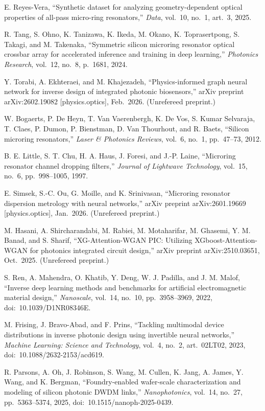 \documentclass[11pt]{article}
\begin{document}
\begin{enumerate}[label={[\arabic*]},leftmargin=2.2em,itemsep=3pt]
E. Reyes-Vera, ``Synthetic dataset for analyzing geometry-dependent optical
properties of all-pass micro-ring resonators,'' \emph{Data}, vol.~10, no.~1,
art.~3, 2025.
\item R. Tang, S. Ohno, K. Tanizawa, K. Ikeda, M. Okano, K. Toprasertpong,
S. Takagi, and M. Takenaka, ``Symmetric silicon microring resonator optical
crossbar array for accelerated inference and training in deep learning,''
\emph{Photonics Research}, vol.~12, no.~8, p.~1681, 2024.
\item Y. Torabi, A. Ekhteraei, and M. Khajezadeh, ``Physics-informed graph
neural network for inverse design of integrated photonic biosensors,'' arXiv
preprint arXiv:2602.19082 [physics.optics], Feb.\ 2026. (Unrefereed preprint.)
\item W. Bogaerts, P. De Heyn, T. Van Vaerenbergh, K. De Vos, S. Kumar
Selvaraja, T. Claes, P. Dumon, P. Bienstman, D. Van Thourhout, and R. Baets,
``Silicon microring resonators,'' \emph{Laser \& Photonics Reviews}, vol.~6,
no.~1, pp.~47--73, 2012.
\item B. E. Little, S. T. Chu, H. A. Haus, J. Foresi, and J.-P. Laine,
``Microring resonator channel dropping filters,'' \emph{Journal of Lightwave
Technology}, vol.~15, no.~6, pp.~998--1005, 1997.
\item E. Simsek, S.-C. Ou, G. Moille, and K. Srinivasan, ``Microring resonator
dispersion metrology with neural networks,'' arXiv preprint arXiv:2601.19669
[physics.optics], Jan.\ 2026. (Unrefereed preprint.)
\item M. Hasani, A. Shircharandabi, M. Rabiei, M. Motaharifar, M. Ghasemi,
Y. M. Banad, and S. Sharif, ``XG-Attention-WGAN PIC: Utilizing
XGboost-Attention-WGAN for photonics integrated circuit design,'' arXiv
preprint arXiv:2510.03651, Oct.\ 2025. (Unrefereed preprint.)
\item S. Ren, A. Mahendra, O. Khatib, Y. Deng, W. J. Padilla, and J. M. Malof, ``Inverse deep learning methods and benchmarks for artificial electromagnetic material design,'' \emph{Nanoscale}, vol.~14, no.~10, pp.~3958--3969, 2022, doi:~10.1039/D1NR08346E.
\item M. Frising, J. Bravo-Abad, and F. Prins, ``Tackling multimodal device distributions in inverse photonic design using invertible neural networks,'' \emph{Machine Learning: Science and Technology}, vol.~4, no.~2, art.~02LT02, 2023, doi:~10.1088/2632-2153/acd619.
\item R. Parsons, A. Oh, J. Robinson, S. Wang, M. Cullen, K. Jang, A. James, Y. Wang, and K. Bergman, ``Foundry-enabled wafer-scale characterization and modeling of silicon photonic DWDM links,'' \emph{Nanophotonics}, vol.~14, no.~27, pp.~5363--5374, 2025, doi:~10.1515/nanoph-2025-0439.

\end{enumerate}
\end{document}
